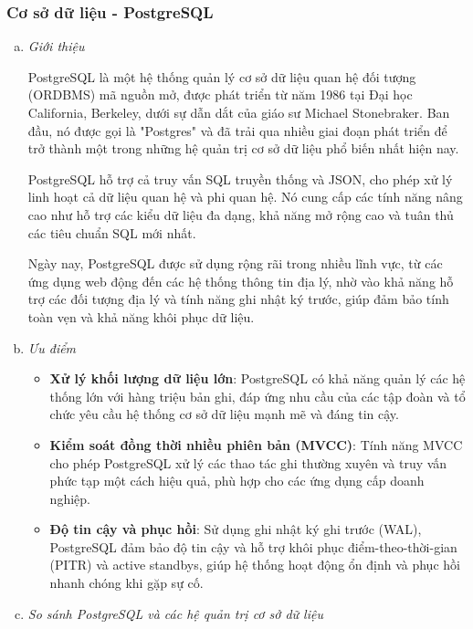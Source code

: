 \subsubsection{Cơ sở dữ liệu - PostgreSQL}
\begin{enumerate}[(a)]
	\item \textit{Giới thiệu}

	      PostgreSQL là một hệ thống quản lý cơ sở dữ liệu quan hệ đối tượng (ORDBMS) mã nguồn mở, được phát triển từ năm 1986 tại Đại học California, Berkeley, dưới sự dẫn dắt của giáo sư Michael Stonebraker. Ban đầu, nó được gọi là "Postgres" và đã trải qua nhiều giai đoạn phát triển để trở thành một trong những hệ quản trị cơ sở dữ liệu phổ biến nhất hiện nay.

	      PostgreSQL hỗ trợ cả truy vấn SQL truyền thống và JSON, cho phép xử lý linh hoạt cả dữ liệu quan hệ và phi quan hệ. Nó cung cấp các tính năng nâng cao như hỗ trợ các kiểu dữ liệu đa dạng, khả năng mở rộng cao và tuân thủ các tiêu chuẩn SQL mới nhất.

	      Ngày nay, PostgreSQL được sử dụng rộng rãi trong nhiều lĩnh vực, từ các ứng dụng web động đến các hệ thống thông tin địa lý, nhờ vào khả năng hỗ trợ các đối tượng địa lý và tính năng ghi nhật ký trước, giúp đảm bảo tính toàn vẹn và khả năng khôi phục dữ liệu.

	\item \textit{Ưu điểm}

	      \begin{itemize}
		      \item \textbf{Xử lý khối lượng dữ liệu lớn}: PostgreSQL có khả năng quản lý các hệ thống lớn với hàng triệu bản ghi, đáp ứng nhu cầu của các tập đoàn và tổ chức yêu cầu hệ thống cơ sở dữ liệu mạnh mẽ và đáng tin cậy.
		      \item \textbf{Kiểm soát đồng thời nhiều phiên bản (MVCC)}: Tính năng MVCC cho phép PostgreSQL xử lý các thao tác ghi thường xuyên và truy vấn phức tạp một cách hiệu quả, phù hợp cho các ứng dụng cấp doanh nghiệp.
		      \item \textbf{Độ tin cậy và phục hồi}: Sử dụng ghi nhật ký ghi trước (WAL), PostgreSQL đảm bảo độ tin cậy và hỗ trợ khôi phục điểm-theo-thời-gian (PITR) và active standbys, giúp hệ thống hoạt động ổn định và phục hồi nhanh chóng khi gặp sự cố.
	      \end{itemize}

	\item \textit{So sánh PostgreSQL và các hệ quản trị cơ sở dữ liệu}


\end{enumerate}
